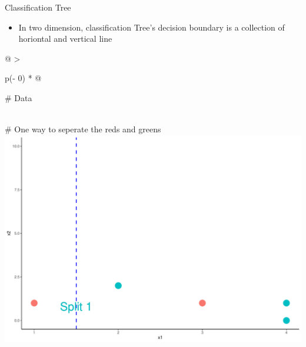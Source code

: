 \documentclass[
  ignorenonframetext,
]{beamer}
\providecommand{\tightlist}{%
  \setlength{\itemsep}{0pt}\setlength{\parskip}{0pt}}
\begin{document}
\begin{frame}{Classification Tree}
\protect\hypertarget{classification-tree}{}
\begin{itemize}
\tightlist
\item
  In two dimension, classification Tree's decision boundary is a
  collection of horiontal and vertical line
\end{itemize}

\begin{longtable}[]{@{}
  >{\raggedright\arraybackslash}p{(\columnwidth - 0\tabcolsep) * }@{}}
\toprule
\begin{minipage}[b]{\linewidth}\raggedright
\# Data
\end{minipage} \\
\midrule
\endhead
\# One way to seperate the reds and greens \\
\includegraphics{classification_tree_files/figure-beamer/unnamed-chunk-2-1.pdf} \\
\bottomrule
\end{longtable}
\end{frame}
\end{document}
